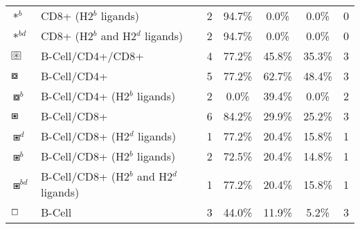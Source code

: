 \begin{tabular}{llccccc}
                                          $ \ast^b $ &                    CD8+ (H2$^b$ ligands) &            2 &         94.7\% &           0.0\% &          0.0\% &                          0 \\
                                       $ \ast^{bd} $ &         CD8+ (H2$^b$ and H2$^d$ ligands) &            2 &         94.7\% &           0.0\% &          0.0\% &                          0 \\
 $ \setlength{\fboxsep}{0.5pt} \boxed{\circledast} $ &                         B-Cell/CD4+/CD8+ &            4 &         77.2\% &          45.8\% &         35.3\% &                          3 \\
                                      $ \boxcircle $ &                              B-Cell/CD4+ &            5 &         77.2\% &          62.7\% &         48.4\% &                          3 \\
                                    $ \boxcircle^b $ &             B-Cell/CD4+ (H2$^b$ ligands) &            2 &          0.0\% &          39.4\% &          0.0\% &                          2 \\
                                         $ \boxast $ &                              B-Cell/CD8+ &            6 &         84.2\% &          29.9\% &         25.2\% &                          3 \\
                                       $ \boxast^d $ &             B-Cell/CD8+ (H2$^d$ ligands) &            1 &         77.2\% &          20.4\% &         15.8\% &                          1 \\
                                       $ \boxast^b $ &             B-Cell/CD8+ (H2$^b$ ligands) &            2 &         72.5\% &          20.4\% &         14.8\% &                          1 \\
                                    $ \boxast^{bd} $ &  B-Cell/CD8+ (H2$^b$ and H2$^d$ ligands) &            1 &         77.2\% &          20.4\% &         15.8\% &                          1 \\
                                       $ \boxempty $ &                                   B-Cell &            3 &         44.0\% &          11.9\% &          5.2\% &                          3 \\
\bottomrule
\end{tabular}
